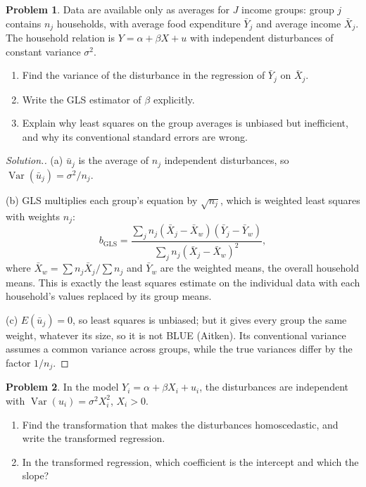 \documentclass[11pt,a4paper]{article}
\numberwithin{equation}{section}
\DeclareMathOperator{\Var}{Var}
\theoremstyle{definition}
\newtheorem{problemx}{Problem}[subsection]
\newenvironment{problem}{\begin{problemx}}{\end{problemx}}
\newenvironment{solution}
  {\renewcommand{\qedsymbol}{}\begin{proof}[\textit{Solution}.]}
  {\end{proof}}
\begin{document}
\begin{problem}
Data are available only as averages for $J$ income groups: group $j$ contains $n_j$ households, with average food expenditure $\bar Y_j$ and average
income $\bar X_j$. The household relation is $Y = \alpha + \beta X + u$ with independent disturbances of constant variance $\sigma^2$.
\begin{enumerate}[label=(\alph*)]
\item Find the variance of the disturbance in the regression of $\bar Y_j$ on $\bar X_j$.
\item Write the GLS estimator of $\beta$ explicitly.
\item Explain why least squares on the group averages is unbiased but inefficient, and why its conventional standard errors are wrong.
\end{enumerate}
\end{problem}

\begin{solution}
(a) $\bar u_j$ is the average of $n_j$ independent disturbances, so $\Var(\bar u_j) = \sigma^2/n_j$.

(b) GLS multiplies each group's equation by $\sqrt{n_j}$, which is weighted least squares with weights $n_j$:
\[
b_{\text{GLS}} = \frac{\sum_jn_j(\bar X_j - \bar X_w)(\bar Y_j - \bar Y_w)}{\sum_jn_j(\bar X_j - \bar X_w)^2},
\]
where $\bar X_w = \sum n_j\bar X_j/\sum n_j$ and $\bar Y_w$ are the weighted means, the overall household means. This is exactly the least squares estimate on
the individual data with each household's values replaced by its group means.

(c) $E(\bar u_j) = 0$, so least squares is unbiased; but it gives every group the same weight, whatever its size, so it is not BLUE (Aitken). Its conventional
variance assumes a common variance across groups, while the true variances differ by the factor $1/n_j$.
\end{solution}

\begin{problem}
In the model $Y_i = \alpha + \beta X_i + u_i$, the disturbances are independent with $\Var(u_i) = \sigma^2X_i^2$, $X_i > 0$.
\begin{enumerate}[label=(\alph*)]
\item Find the transformation that makes the disturbances homoscedastic, and write the transformed regression.
\item In the transformed regression, which coefficient is the intercept and which the slope?
\end{enumerate}
\end{problem}
\end{document}
